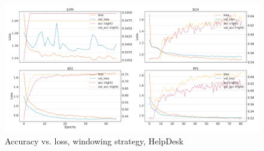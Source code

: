 \begin{figure}[!htb]
    \centering
    \includegraphics[width=\textwidth]{gfx/helpdesk/windowed_loss_acc_curve.pdf}
    \caption{Accuracy vs. loss, windowing strategy, HelpDesk}
\end{figure}
\FloatBarrier

